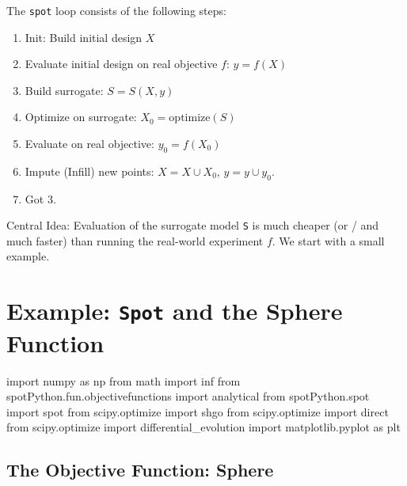 \documentclass[
  letterpaper,
  DIV=11,
  numbers=noendperiod]{scrreprt}
\newenvironment{Shaded}{\begin{snugshade}}{\end{snugshade}}
\newcommand{\ImportTok}[1]{\textcolor[rgb]{0.00,0.46,0.62}{#1}}
\newcommand{\NormalTok}[1]{\textcolor[rgb]{0.00,0.23,0.31}{#1}}
\providecommand{\tightlist}{%
  \setlength{\itemsep}{0pt}\setlength{\parskip}{0pt}}\usepackage{longtable,booktabs,array}
\begin{document}
The \texttt{spot} loop consists of the following steps:

\begin{enumerate}
\def\labelenumi{\arabic{enumi}.}
\tightlist
\item
  Init: Build initial design \(X\)
\item
  Evaluate initial design on real objective \(f\): \(y = f(X)\)
\item
  Build surrogate: \(S = S(X,y)\)
\item
  Optimize on surrogate: \(X_0 = \text{optimize}(S)\)
\item
  Evaluate on real objective: \(y_0 = f(X_0)\)
\item
  Impute (Infill) new points: \(X = X \cup X_0\), \(y = y \cup y_0\).
\item
  Got 3.
\end{enumerate}

Central Idea: Evaluation of the surrogate model \texttt{S} is much
cheaper (or / and much faster) than running the real-world experiment
\(f\). We start with a small example.

\hypertarget{example-spot-and-the-sphere-function}{%
\section{\texorpdfstring{Example: \texttt{Spot} and the Sphere
Function}{Example: Spot and the Sphere Function}}\label{example-spot-and-the-sphere-function}}

\begin{Shaded}
\begin{Highlighting}[]
\ImportTok{import}\NormalTok{ numpy }\ImportTok{as}\NormalTok{ np}
\ImportTok{from}\NormalTok{ math }\ImportTok{import}\NormalTok{ inf}
\ImportTok{from}\NormalTok{ spotPython.fun.objectivefunctions }\ImportTok{import}\NormalTok{ analytical}
\ImportTok{from}\NormalTok{ spotPython.spot }\ImportTok{import}\NormalTok{ spot}
\ImportTok{from}\NormalTok{ scipy.optimize }\ImportTok{import}\NormalTok{ shgo}
\ImportTok{from}\NormalTok{ scipy.optimize }\ImportTok{import}\NormalTok{ direct}
\ImportTok{from}\NormalTok{ scipy.optimize }\ImportTok{import}\NormalTok{ differential\_evolution}
\ImportTok{import}\NormalTok{ matplotlib.pyplot }\ImportTok{as}\NormalTok{ plt}
\end{Highlighting}
\end{Shaded}

\hypertarget{the-objective-function-sphere}{%
\subsection{The Objective Function:
Sphere}\label{the-objective-function-sphere}}
\end{document}
